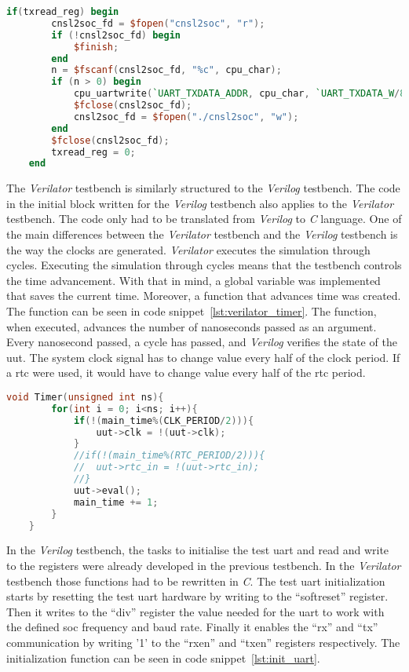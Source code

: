 \begin{lstlisting}[language=Verilog, caption={Write byte from \textit{Console} to \acrshort{soc}.}, label=lst:write2soc]
    if(txread_reg) begin
        cnsl2soc_fd = $fopen("cnsl2soc", "r");
        if (!cnsl2soc_fd) begin
            $finish;
        end
        n = $fscanf(cnsl2soc_fd, "%c", cpu_char);
        if (n > 0) begin
            cpu_uartwrite(`UART_TXDATA_ADDR, cpu_char, `UART_TXDATA_W/8);
            $fclose(cnsl2soc_fd);
            cnsl2soc_fd = $fopen("./cnsl2soc", "w");
        end
        $fclose(cnsl2soc_fd);
        txread_reg = 0;
    end
\end{lstlisting}

The \textit{Verilator} testbench is similarly structured to the \textit{Verilog} testbench. The code in the initial block written for the \textit{Verilog} testbench also applies to the \textit{Verilator} testbench. The code only had to be translated from \textit{Verilog} to \textit{C} language. One of the main differences between the \textit{Verilator} testbench and the \textit{Verilog} testbench is the way the clocks are generated. \textit{Verilator} executes the simulation through cycles. Executing the simulation through cycles means that the testbench controls the time advancement. With that in mind, a global variable was implemented that saves the current time. Moreover, a function that advances time was created. The function can be seen in code snippet~\ref{lst:verilator_timer}. The function, when executed, advances the number of nanoseconds passed as an argument. Every nanosecond passed, a cycle has passed, and \textit{Verilog} verifies the state of the \acrfull{uut}. The system clock signal has to change value every half of the clock period. If a \acrshort{rtc} were used, it would have to change value every half of the \acrlong{rtc} period.

\begin{lstlisting}[language=C, caption={\textit{Verilator} Timer function.}, label=lst:verilator_timer]
    void Timer(unsigned int ns){
        for(int i = 0; i<ns; i++){
            if(!(main_time%(CLK_PERIOD/2))){
                uut->clk = !(uut->clk);
            }
            //if(!(main_time%(RTC_PERIOD/2))){
            //  uut->rtc_in = !(uut->rtc_in);
            //}
            uut->eval();
            main_time += 1;
        }
    }
\end{lstlisting}

In the \textit{Verilog} testbench, the tasks to initialise the test \acrshort{uart} and read and write to the registers were already developed in the previous testbench. In the \textit{Verilator} testbench those functions had to be rewritten in \textit{C}. The test \acrshort{uart} initialization starts by resetting the test \acrshort{uart} hardware by writing to the \enquote{softreset} register. Then it writes to the \enquote{div} register the value needed for the \acrshort{uart} to work with the defined \acrshort{soc} frequency and baud rate. Finally it enables the \enquote{rx} and \enquote{tx} communication by writing '1' to the \enquote{rxen} and \enquote{txen} registers respectively. The initialization function can be seen in code snippet~\ref{lst:init_uart}.

